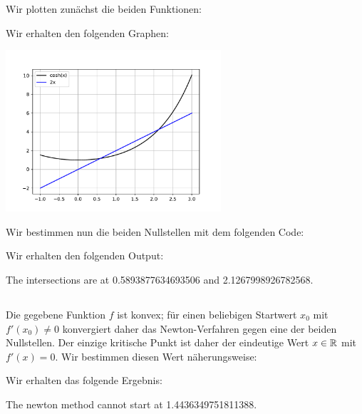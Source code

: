 \section{}



\subsection{}

Wir plotten zunächst die beiden Funktionen:



Wir erhalten den folgenden Graphen:

\begin{center}
  \includegraphics[width = 0.6\textwidth]{chapter_04/exercise_04_15_figure.pdf}
\end{center}

Wir bestimmen nun die beiden Nullstellen mit dem folgenden Code:



Wir erhalten den folgenden Output:

\begin{consoleoutput}
The intersections are at 0.5893877634693506 and 2.1267998926782568.
\end{consoleoutput}



\subsection{}

Die gegebene Funktion $f$ ist konvex;
für einen beliebigen Startwert $x_0$ mit $f'(x_0) \neq 0$ konvergiert daher das Newton-Verfahren gegen eine der beiden Nullstellen.
Der einzige kritische Punkt ist daher der eindeutige Wert $x \in \mathbb{R}$ mit $f'(x) = 0$.
Wir bestimmen diesen Wert näherungsweise:



Wir erhalten das folgende Ergebnis:

\begin{consoleoutput}
The newton method cannot start at 1.4436349751811388.
\end{consoleoutput}
